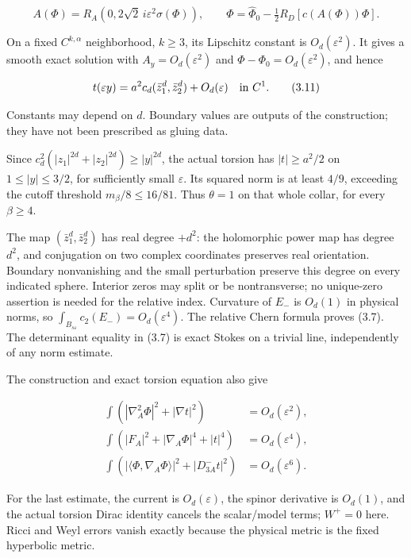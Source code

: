 \documentclass[
  11pt,
]{article}
\begin{document}
\[
 A(\Phi)=R_A(0,2\sqrt2\,i\varepsilon^2\sigma(\Phi)),\qquad
 \Phi=\widehat\Phi_0-\tfrac12R_D[c(A(\Phi))\Phi].
 \tag{3.10}
\]

On a fixed \(C^{k,\alpha}\) neighborhood, \(k\ge3\), its Lipschitz
constant is \(O_d(\varepsilon^2)\). It gives a smooth exact solution
with \(A_y=O_d(\varepsilon^2)\) and \(\Phi-\Phi_0=O_d(\varepsilon^2)\),
and hence

\[
 t(\varepsilon y)=a^2c_d(\bar z_1^d,\bar z_2^d)+O_d(\varepsilon)
                                                \quad\hbox{in }C^1.
 \tag{3.11}
\]

Constants may depend on \(d\). Boundary values are outputs of the
construction; they have not been prescribed as gluing data.

Since \(c_d^2(|z_1|^{2d}+|z_2|^{2d})\ge|y|^{2d}\), the actual torsion
has \(|t|\ge a^2/2\) on \(1\le|y|\le3/2\), for sufficiently small
\(\varepsilon\). Its squared norm is at least \(4/9\), exceeding the
cutoff threshold \(m_\beta/8\le16/81\). Thus \(\theta=1\) on that whole
collar, for every \(\beta\ge4\).

The map \((\bar z_1^d,\bar z_2^d)\) has real degree \(+d^2\): the
holomorphic power map has degree \(d^2\), and conjugation on two complex
coordinates preserves real orientation. Boundary nonvanishing and the
small perturbation preserve this degree on every indicated sphere.
Interior zeros may split or be nontransverse; no unique-zero assertion
is needed for the relative index. Curvature of \(E_-\) is \(O_d(1)\) in
physical norms, so
\(\int_{B_{s\varepsilon}}c_2(E_-)=O_d(\varepsilon^4)\). The relative
Chern formula proves (3.7). The determinant equality in (3.7) is exact
Stokes on a trivial line, independently of any norm estimate.

The construction and exact torsion equation also give

\[
 \begin{split}
 \int(|\nabla_A^2\Phi|^2+|\nabla t|^2)&=O_d(\varepsilon^2),\\
 \int(|F_A|^2+|\nabla_A\Phi|^4+|t|^4)&=O_d(\varepsilon^4),\\
 \int(|\langle\Phi,\nabla_A\Phi\rangle|^2+|D_{3A}^-t|^2)
                                             &=O_d(\varepsilon^6).
 \end{split}
 \tag{3.12}
\]

For the last estimate, the current is \(O_d(\varepsilon)\), the spinor
derivative is \(O_d(1)\), and the actual torsion Dirac identity cancels
the scalar/model terms; \(W^+=0\) here. Ricci and Weyl errors vanish
exactly because the physical metric is the fixed hyperbolic metric.
\end{document}
